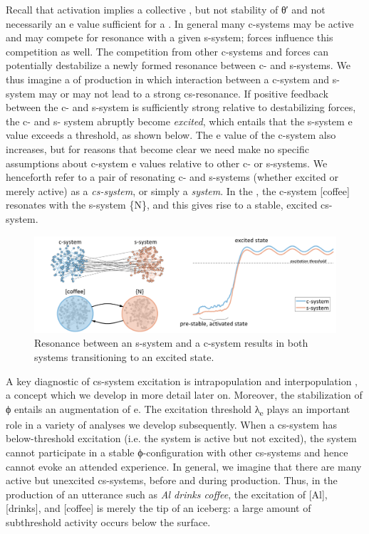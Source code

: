   Recall that activation implies a collective , but not stability of θ′ and not necessarily an e value sufficient for a . In general many c-systems may be active and may compete for resonance with a given s-system;  forces influence this competition as well. The competition from other c-systems and  forces can potentially destabilize a newly formed resonance between c- and s-systems. We thus imagine a  of production in which interaction between a c-system and s-system may or may not lead to a strong cs-resonance. If positive feedback between the c- and s-system is sufficiently strong relative to destabilizing forces, the c- and s- system abruptly become \textit{excited}, which entails that the s-system e value exceeds a threshold, as shown below. The e value of the c-system also increases, but for reasons that become clear we need make no specific assumptions about c-system e values relative to other c- or s-systems. We henceforth refer to a pair of resonating c- and s-systems (whether excited or merely active) as a \textit{cs-system}, or simply a \textit{system}. In the {}, the c-system [coffee] resonates with the s-system \{N\}, and this gives rise to a stable, excited cs-system.

  
\begin{figure}
\includegraphics[width=\textwidth]{figures/Tilsen-img17.png}
\caption{Resonance between an s-system and a c-system results in both systems transitioning to an excited state.}
\label{fig:2:10}
\end{figure}
 
  A key diagnostic of cs-system excitation is intrapopulation and interpopulation , a concept which we develop in more detail later on. Moreover, the stabilization of ϕ entails an augmentation of e. The excitation threshold λ\textsubscript{e} plays an important role in a variety of analyses we develop subsequently. When a cs-system has below-threshold excitation (i.e. the system is active but not excited), the system cannot participate in a stable ϕ-configuration with other cs-systems and hence cannot evoke an attended  experience. In general, we imagine that there are many active but unexcited cs-systems, before and during production. Thus, in the production of an utterance such as \textit{Al drinks coffee}, the excitation of [Al], [drinks], and [coffee] is merely the tip of an iceberg: a large amount of subthreshold activity occurs below the surface.


